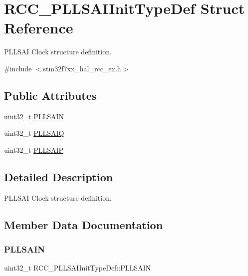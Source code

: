 \hypertarget{struct_r_c_c___p_l_l_s_a_i_init_type_def}{}\section{R\+C\+C\+\_\+\+P\+L\+L\+S\+A\+I\+Init\+Type\+Def Struct Reference}
\label{struct_r_c_c___p_l_l_s_a_i_init_type_def}


P\+L\+L\+S\+AI Clock structure definition.  




{\ttfamily \#include $<$stm32f7xx\+\_\+hal\+\_\+rcc\+\_\+ex.\+h$>$}

\subsection*{Public Attributes}
\begin{DoxyCompactItemize}
\item 
uint32\+\_\+t \mbox{\hyperlink{struct_r_c_c___p_l_l_s_a_i_init_type_def_a7ec92e831b8ca06243fce02f46b76807}{P\+L\+L\+S\+A\+IN}}
\item 
uint32\+\_\+t \mbox{\hyperlink{struct_r_c_c___p_l_l_s_a_i_init_type_def_addd252bc81b5eb646803cf3e0941499c}{P\+L\+L\+S\+A\+IQ}}
\item 
uint32\+\_\+t \mbox{\hyperlink{struct_r_c_c___p_l_l_s_a_i_init_type_def_a8cfa7d387fc9b118e9066a63d2b845bf}{P\+L\+L\+S\+A\+IP}}
\end{DoxyCompactItemize}


\subsection{Detailed Description}
P\+L\+L\+S\+AI Clock structure definition. 

\subsection{Member Data Documentation}
\mbox{\label{struct_r_c_c___p_l_l_s_a_i_init_type_def_a7ec92e831b8ca06243fce02f46b76807}} 
\subsubsection{\texorpdfstring{PLLSAIN}{PLLSAIN}}
{\footnotesize\ttfamily uint32\+\_\+t R\+C\+C\+\_\+\+P\+L\+L\+S\+A\+I\+Init\+Type\+Def\+::\+P\+L\+L\+S\+A\+IN}

